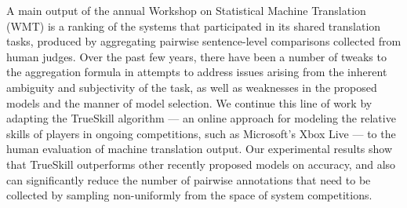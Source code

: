 A main output of the annual Workshop on Statistical Machine Translation (WMT) is a ranking of the systems that participated in its shared translation tasks, produced by aggregating pairwise sentence-level comparisons collected from human judges. Over the past few years, there have been a number of tweaks to the aggregation formula in attempts to address issues arising from the inherent ambiguity and subjectivity of the task, as well as weaknesses in the proposed models and the manner of model selection. We continue this line of work by adapting the TrueSkill algorithm — an online approach for modeling the relative skills of players in ongoing competitions, such as Microsoft's Xbox Live — to the human evaluation of machine translation output. Our experimental results show that TrueSkill outperforms other recently proposed models on accuracy, and also can significantly reduce the number of pairwise annotations that need to be collected by sampling non-uniformly from the space of system competitions.

